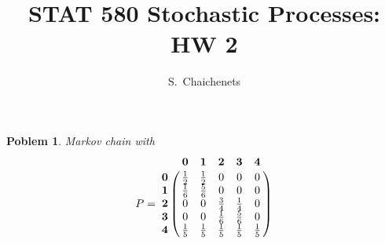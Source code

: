 \documentclass[8pt,notitlepage,twocolumn]{report}
\newtheorem{problem}{Poblem}
\begin{document}
\title{STAT 580 Stochastic Processes: HW 2}
\author{ S.\ Chaichenets }
\maketitle



\begin{problem}
Markov chain with 
\small
\begin{equation}
P = 
\bordermatrix{
	& \mathbf{0} & \mathbf{1} & \mathbf{2} & \mathbf{3} & \mathbf{4} \cr
\mathbf{0} &  \frac{1}{2} & \frac{1}{2} & 0 & 0 & 0 \cr
\mathbf{1} &  \frac{1}{6} & \frac{5}{6} & 0 & 0 & 0 \cr
\mathbf{2} &  0 & 0 & \frac{3}{4} & \frac{1}{4} & 0 \cr
\mathbf{3} &  0 & 0 & \frac{1}{6} & \frac{5}{6} & 0 \cr
\mathbf{4} &  \frac{1}{5} & \frac{1}{5} & \frac{1}{5} & \frac{1}{5} & \frac{1}{5} \cr
}
\end{equation}
\normalsize


\end{problem}
\end{document}
